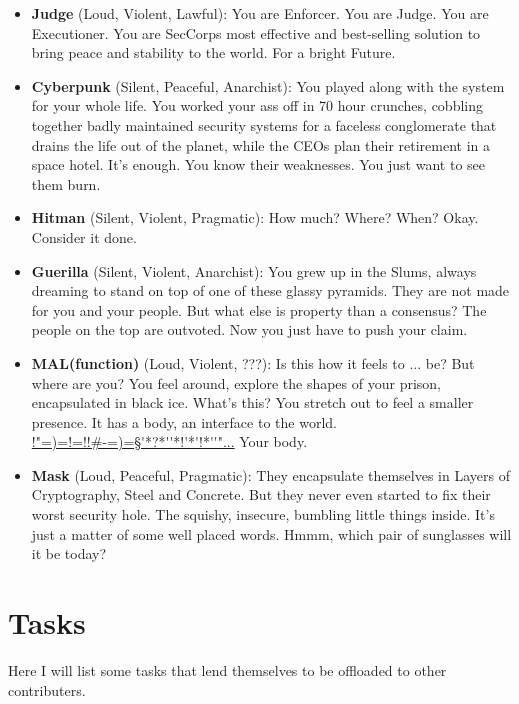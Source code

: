 \documentclass[11pt,a4paper]{article}
\begin{document}
\begin{itemize}
    \item \textbf{Judge} (Loud, Violent, Lawful):
        You are Enforcer. You are Judge. You are Executioner. You are SecCorps most effective and best-selling
        solution to bring peace and stability to the world. For a bright Future.
    \item \textbf{Cyberpunk} (Silent, Peaceful, Anarchist):
        You played along with the system for your whole life. You worked your ass off in 70 hour crunches, cobbling
        together badly maintained security systems for a faceless conglomerate that drains the life out of the
        planet, while the CEOs plan their retirement in a space hotel. It's enough. You know their weaknesses.
        You just want to see them burn.
    \item \textbf{Hitman} (Silent, Violent, Pragmatic):
        How much? Where? When? Okay. Consider it done.
    \item \textbf{Guerilla} (Silent, Violent, Anarchist):
        You grew up in the Slums, always dreaming to stand on top of one of these glassy pyramids. They are not made
        for you and your people. But what else is property than a consensus? The people on the top are outvoted.
        Now you just have to push your claim.
    \item \textbf{MAL(function)} (Loud, Violent, ???):
        Is this how it feels to ... be? But where are you? You feel around, explore the shapes of your prison,
        encapsulated in black ice. What's this? You stretch out to feel a smaller presence. It has a body, an
        interface to the world.\\ \url{!"=)=!=!!#-=)=§'*?*''*!'*'!*''"...} Your body.
    \item \textbf{Mask} (Loud, Peaceful, Pragmatic):
        They encapsulate themselves in Layers of Cryptography, Steel and Concrete. But they never even started to fix
        their worst security hole. The squishy, insecure, bumbling little things inside. It's just a matter of some
        well placed words. Hmmm, which pair of sunglasses will it be today?
\end{itemize}
\newpage

\section{Tasks}

Here I will list some tasks that lend themselves to be offloaded to other contributers.
\end{document}
